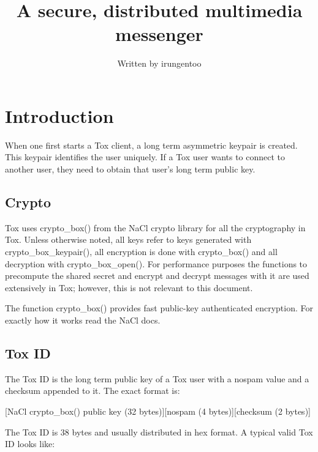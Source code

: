 \documentclass{tox}
\begin{document}
\title{A secure, distributed multimedia messenger}


\author{Written by irungentoo} %

\maketitle

\tableofcontents
\clearpage

\section{Introduction}

When one first starts a Tox client, a long term asymmetric keypair is created. 
This keypair identifies the user uniquely. If a Tox user wants to connect to 
another user, they need to obtain that user's long term public key. 

\subsection{Crypto}

Tox uses crypto\_box() from the NaCl crypto library for all the cryptography in 
Tox. Unless otherwise noted, all keys refer to keys generated with 
crypto\_box\_keypair(), all encryption is done with crypto\_box() and all 
decryption with crypto\_box\_open(). For performance purposes the functions to 
precompute the shared secret and encrypt and decrypt messages with it are used 
extensively in Tox; however, this is not relevant to this document.

The function crypto\_box() provides fast public-key authenticated encryption. 
For exactly how it works read the NaCl docs.

\subsection{Tox ID}

The Tox ID is the long term public key of a Tox user with a nospam value and 
a checksum appended to it. The exact format is:

[NaCl crypto\_box() public key (32 bytes)][nospam (4 bytes)][checksum (2 bytes)]

The Tox ID is 38 bytes and usually distributed in hex format. A typical valid 
Tox ID looks like:
\end{document}
